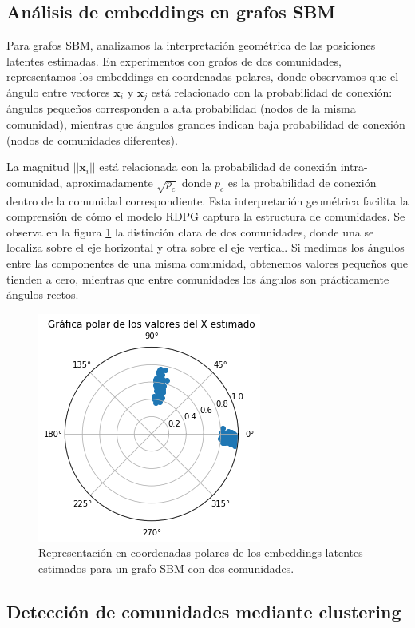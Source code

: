 \documentclass{article}
\begin{document}
\subsection{Análisis de embeddings en grafos SBM}

Para grafos SBM, analizamos la interpretación geométrica de las posiciones latentes estimadas. En experimentos con grafos de dos comunidades, representamos los embeddings en coordenadas polares, donde observamos que el ángulo entre vectores $\mathbf{x}_i$ y $\mathbf{x}_j$ está relacionado con la probabilidad de conexión: ángulos pequeños corresponden a alta probabilidad (nodos de la misma comunidad), mientras que ángulos grandes indican baja probabilidad de conexión (nodos de comunidades diferentes).

La magnitud $||\mathbf{x}_i||$ está relacionada con la probabilidad de conexión intra-comunidad, aproximadamente $\sqrt{p_c}$ donde $p_c$ es la probabilidad de conexión dentro de la comunidad correspondiente. Esta interpretación geométrica facilita la comprensión de cómo el modelo RDPG captura la estructura de comunidades. Se observa en la figura \ref{fig:coordenadas polares} la distinción clara de dos comunidades, donde una se localiza sobre el eje horizontal y otra sobre el eje vertical. Si medimos los ángulos entre las componentes de una misma comunidad, obtenemos valores pequeños que tienden a cero, mientras que entre comunidades los ángulos son prácticamente ángulos rectos.

\begin{figure}[htb]
    \centering
    \includegraphics[width=0.4\linewidth]{images/coordenadas_polares.png}
    \caption{Representación en coordenadas polares de los embeddings latentes estimados para un grafo SBM con dos comunidades.}
    \label{fig:coordenadas polares}
\end{figure}

\subsection{Detección de comunidades mediante clustering}
\end{document}
